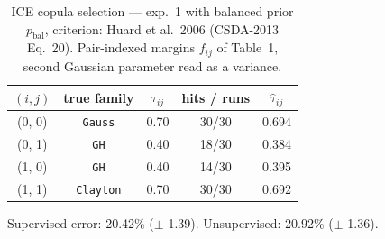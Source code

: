 \begin{table}[htbp]
  \centering
  \caption{ICE copula selection — exp.\ 1 with balanced prior $p_{\text{bal}}$, criterion: Huard et al.\ 2006 (CSDA-2013 Eq.\ 20). Pair-indexed margins $f_{ij}$ of Table~1, second Gaussian parameter read as a variance.}
  \label{tab:exp3-exp1_bal_p__huard}
  \begin{tabular}{ccccc}
    \toprule
    $(i, j)$ & true family & $\tau_{ij}$ & hits / runs & $\hat\tau_{ij}$ \\
    \midrule
    (0, 0) & \texttt{Gauss} & 0.70 & 30/30 & 0.694 \\
    (0, 1) & \texttt{GH} & 0.40 & 18/30 & 0.384 \\
    (1, 0) & \texttt{GH} & 0.40 & 14/30 & 0.395 \\
    (1, 1) & \texttt{Clayton} & 0.70 & 30/30 & 0.692 \\
    \bottomrule
  \end{tabular}
  \par\smallskip Supervised error: 20.42\% ($\pm$ 1.39). Unsupervised: 20.92\% ($\pm$ 1.36).
\end{table}
